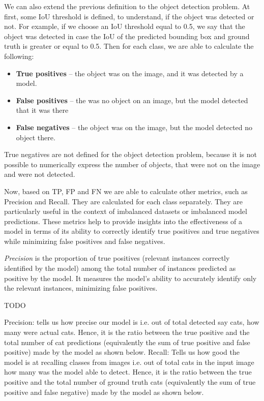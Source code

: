 \documentclass[14pt,a4paper]{extarticle}
\newcounter{e}
\numberwithin{equation}{section}
\numberwithin{figure}{section}
\begin{document}
We can also extend the previous definition to the object detection problem. At first, some IoU threshold is defined, to understand, if the object was detected or not. For example, if we choose an IoU threshold equal to 0.5, we say that the object was detected in case the IoU of the predicted bounding box and ground truth is greater or equal to 0.5. Then for each class, we are able to calculate the following:
\begin{itemize}
    \item \textbf{True positives} -- the object was on the image, and it was detected by a model.
    \item \textbf{False positives} -- the was no object on an image, but the model detected that it was there
    \item \textbf{False negatives} -- the object was on the image, but the model detected no object there.  
\end{itemize}
True negatives are not defined for the object detection problem, because it is not possible to numerically express the number of objects, that were not on the image and were not detected.

Now, based on TP, FP and FN we are able to calculate other metrics, such as Precision and Recall. They are calculated for each class separately. They are particularly useful in the context of imbalanced datasets or imbalanced model predictions. These metrics help to provide insights into the effectiveness of a model in terms of its ability to correctly identify true positives and true negatives while minimizing false positives and false negatives.

\textit{Precision} is the proportion of true positives (relevant instances correctly identified by the model) among the total number of instances predicted as positive by the model. It measures the model's ability to accurately identify only the relevant instances, minimizing false positives.

TODO

Precision: tells us how precise our model is i.e. out of total detected say cats, how many were actual cats. Hence, it is the ratio between the true positive and the total number of cat predictions (equivalently the sum of true positive and false positive) made by the model as shown below.
Recall: Tells us how good the model is at recalling classes from images i.e. out of total cats in the input image how many was the model able to detect. Hence, it is the ratio between the true positive and the total number of ground truth cats (equivalently the sum of true positive and false negative) made by the model as shown below.
\end{document}
